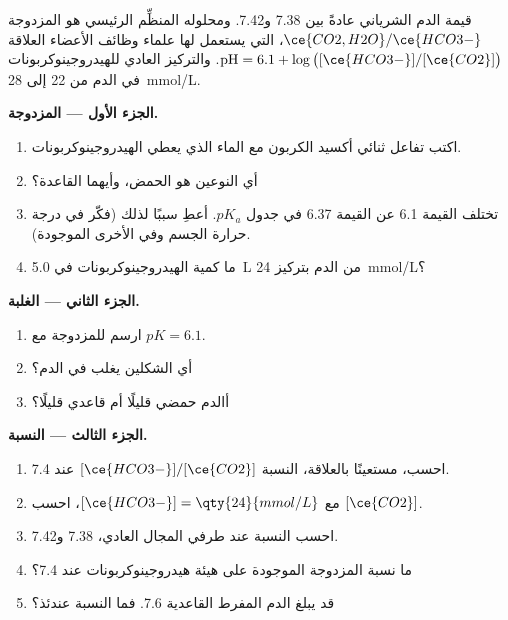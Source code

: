 \begin{problem}
\label{pb:g12:buffers-predominance:1}
قيمة  الدم الشرياني عادةً بين 7.38 و7.42. ومحلوله المنظِّم
الرئيسي هو المزدوجة $\ce{CO2,H2O}/\ce{HCO3-}$، التي يستعمل لها علماء وظائف الأعضاء
العلاقة $\mathrm{pH} = 6.1 + \log\big([\ce{HCO3-}]/[\ce{CO2}]\big)$. والتركيز
العادي للهيدروجينوكربونات في الدم من 22 إلى \qty{28}{mmol/L}.

\medskip
\noindent\textbf{الجزء الأول --- المزدوجة.}
\begin{enumerate}
  \item اكتب تفاعل ثنائي أكسيد الكربون  مع الماء الذي
        يعطي  الهيدروجينوكربونات.
  \item أي النوعين هو الحمض، وأيهما القاعدة؟
  \item تختلف القيمة 6.1 عن القيمة 6.37 في جدول $pK_a$. أعطِ
        سببًا لذلك (فكّر في درجة حرارة الجسم وفي 
        الأخرى الموجودة).
  \item ما كمية الهيدروجينوكربونات في \qty{5.0}{L} من الدم
        بتركيز \qty{24}{mmol/L}؟
\end{enumerate}

\medskip
\noindent\textbf{الجزء الثاني --- الغلبة.}
\begin{enumerate}[resume]
  \item ارسم  للمزدوجة مع $pK = 6.1$.
  \item أي الشكلين يغلب في الدم؟
  \item أالدم حمضي قليلًا أم قاعدي قليلًا؟
\end{enumerate}

\medskip
\noindent\textbf{الجزء الثالث --- النسبة.}
\begin{enumerate}[resume]
  \item احسب، مستعينًا بالعلاقة، النسبة $[\ce{HCO3-}]/[\ce{CO2}]$
        عند  7.4.
  \item مع $[\ce{HCO3-}] = \qty{24}{mmol/L}$، احسب $[\ce{CO2}]$.
  \item احسب النسبة عند طرفي المجال العادي، 7.38
        و7.42.
  \item ما نسبة المزدوجة الموجودة على هيئة هيدروجينوكربونات
        عند  7.4؟
  \item قد يبلغ الدم المفرط القاعدية  7.6. فما النسبة
        عندئذ؟
\end{enumerate}


\end{problem}
